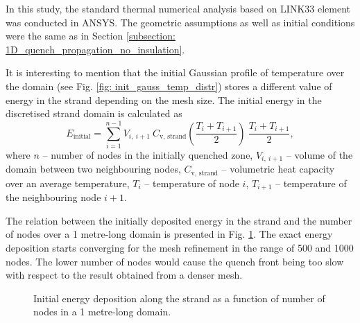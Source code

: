 
In this study, the standard thermal numerical analysis based on LINK33 element was conducted in ANSYS. The geometric assumptions as well as initial conditions were the same as in Section \ref{subsection: 1D_quench_propagation_no_insulation}. 

It is interesting to mention that the initial Gaussian profile of temperature over the domain (see Fig. \ref{fig: init_gauss_temp_distr}) stores a different value of energy in the strand depending on the mesh size. The initial energy in the discretised strand domain is calculated as
\begin{equation}
    E_\text{initial} = \sum_{i=1}^{n-1} V_{i,~i+1}~C_\text{v, strand}(\frac{T_i+T_{i+1}}{2})~\frac{T_i+T_{i+1}}{2},
\end{equation}
where $n$ -- number of nodes in the initially quenched zone, $V_{i,~i+1}$ -- volume of the domain between two neighbouring nodes, $C_\text{v, strand}$ -- volumetric heat capacity over an average temperature, $T_i$ -- temperature of node $i$, $T_{i+1}$ -- temperature of the neighbouring node $i+1$.

The relation between the initially deposited energy in the strand and the number of nodes over a 1 metre-long domain is presented in Fig. \ref{fig: q_vel_modelling_energy_deposition}. The exact energy deposition starts converging for the mesh refinement in the range of 500 and 1000 nodes. The lower number of nodes would cause the quench front being too slow with respect to the result obtained from a denser mesh.

\begin{figure}[H]
\centering
    \caption{Initial energy deposition along the strand as a function of number of nodes in a 1 metre-long domain.}
    \label{fig: q_vel_modelling_energy_deposition}
\end{figure}

